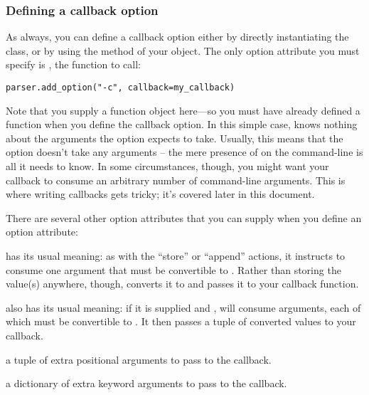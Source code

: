 \subsubsection{Defining a callback option\label{optparse-defining-callback-option}}

As always, you can define a callback option either by directly
instantiating the  class, or by using the
 method of your  object. The
only option attribute you must specify is , the function
to call:

\begin{verbatim}
parser.add_option("-c", callback=my_callback)
\end{verbatim}

Note that you supply a function object here---so you must have
already defined a function  when you define
the callback option.  In this simple case,  knows
nothing about the arguments the  option expects to
take.  Usually, this means that the option doesn't take any arguments
-- the mere presence of  on the command-line is all it
needs to know.  In some circumstances, though, you might want your
callback to consume an arbitrary number of command-line arguments.
This is where writing callbacks gets tricky; it's covered later in
this document.

There are several other option attributes that you can supply when you
define an option attribute:

\begin{definitions}
has its usual meaning: as with the ``store'' or ``append'' actions, it
instructs  to consume one argument that must be
convertible to .  Rather than storing the value(s) anywhere,
though,  converts it to  and passes it to
your callback function.

also has its usual meaning: if it is supplied and ,
 will consume  arguments, each of which
must be convertible to .  It then passes a tuple of
converted values to your callback.

a tuple of extra positional arguments to pass to the callback.
    
a dictionary of extra keyword arguments to pass to the callback.
\end{definitions}

